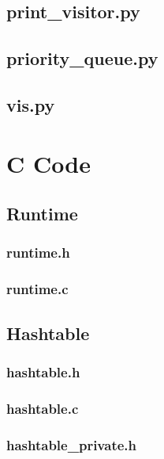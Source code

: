 \documentclass[letter,10pt]{article}
\begin{document}
\subsection{print\_visitor.py}


\subsection{priority\_queue.py}


\subsection{vis.py}


\clearpage
\section*{C Code}

\subsection{Runtime}

\subsubsection{runtime.h}


\subsubsection{runtime.c}


\clearpage
\subsection{Hashtable}
\subsubsection{hashtable.h}


\subsubsection{hashtable.c}


\subsubsection{hashtable\_private.h}

\end{document}
